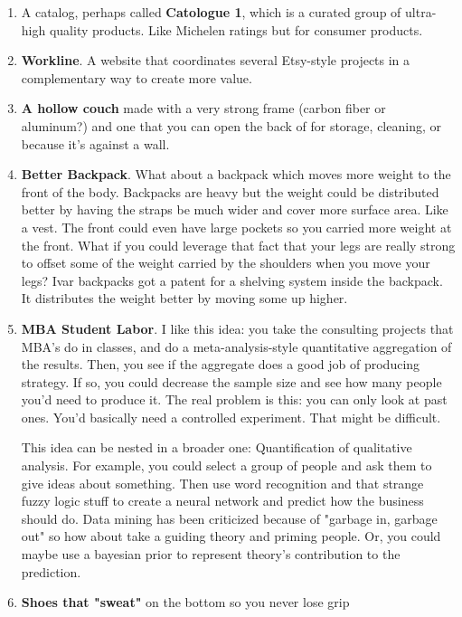\documentclass[paper=a4, fontsize=11pt]{scrartcl} %
\numberwithin{equation}{section} %
\numberwithin{figure}{section} %
\numberwithin{table}{section} %
\begin{document}
\begin{enumerate}
\item A catalog, perhaps called \textbf{Catologue 1}, which is a curated group of ultra-high quality products.  Like Michelen ratings but for consumer products.

\item \textbf{Workline}.  A website that coordinates several Etsy-style projects in a complementary way to create more value.

\item \textbf{A hollow couch} made with a very strong frame (carbon fiber or aluminum?) and one that you can open the back of for storage, cleaning, or because it's against a wall.  

\item  \textbf{Better Backpack}.  What about a backpack which moves more weight to the front of the body.  Backpacks are heavy but the weight could be distributed better by having the straps be much wider and cover more surface area.  Like a vest.  The front could even have large pockets so you carried more weight at the front.  What if you could leverage that fact that your legs are really strong to offset some of the weight carried by the shoulders when you move your legs?  Ivar backpacks got a patent for a shelving system inside the backpack.  It distributes the weight better by moving some up higher.  

\item \textbf{MBA Student Labor}.  I like this idea: you take the consulting projects that MBA's do in classes, and do a meta-analysis-style quantitative aggregation of the results.  Then, you see if the aggregate does a good job of producing strategy.  If so, you could decrease the sample size and see how many people you'd need to produce it.  The real problem is this: you can only look at past ones.  You'd basically need a controlled experiment.  That might be difficult.  

This idea can be nested in a broader one: Quantification of qualitative analysis.  For example, you could select a group of people and ask them to give ideas about something.  Then use word recognition and that strange fuzzy logic stuff to create a neural network and predict how the business should do.  Data mining has been criticized because of "garbage in, garbage out" so how about take a guiding theory and priming people.  Or, you could maybe use a bayesian prior to represent theory's contribution to the prediction. 

\item  \textbf{Shoes that "sweat"} on the bottom so you never lose grip


\end{enumerate}
\end{document}
